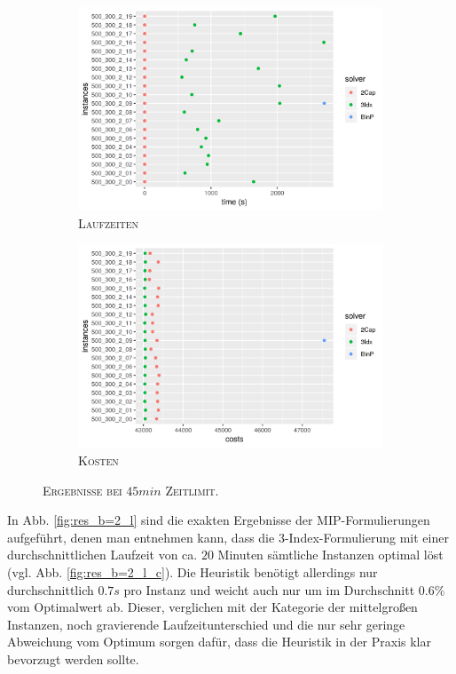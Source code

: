 \begin{figure}[H]
\centering
\begin{subfigure}[b]{0.4\textwidth}
\centering
\includegraphics[width=1.3\textwidth]{img/solver_instance_time_b=2_l_2700s.png}
\caption{\textsc{Laufzeiten}}
\label{fig:b=2_l_runtimes}
\end{subfigure}
\hfill
\begin{subfigure}[b]{0.4\textwidth}
\centering
\includegraphics[width=1.3\textwidth]{img/solver_instance_cost_b=2_l_2700s.png}
\caption{\textsc{Kosten}}
\label{fig:b=2_l_costs}
\end{subfigure}
\caption{\textsc{Ergebnisse bei $45min$ Zeitlimit}.}
\label{fig:res_plots_b=2_l}
\end{figure}

In Abb. \ref{fig:res_b=2_l} sind die exakten Ergebnisse der MIP-Formulierungen aufgeführt, denen man
entnehmen kann, dass die 3-Index-Formulierung mit einer durchschnittlichen Laufzeit von ca. $20$ Minuten sämtliche Instanzen
optimal löst (vgl. Abb. \ref{fig:res_b=2_l_c}). Die Heuristik benötigt allerdings nur durchschnittlich $0.7s$ pro Instanz und
weicht auch nur um im Durchschnitt $0.6 \%$ vom Optimalwert ab. Dieser, verglichen mit der Kategorie der mittelgroßen Instanzen,
noch gravierende Laufzeitunterschied und die nur sehr geringe Abweichung vom Optimum sorgen dafür, dass die Heuristik in der Praxis
klar bevorzugt werden sollte.


